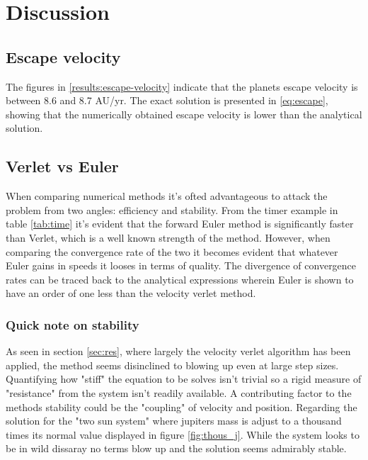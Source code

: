 \section{Discussion}
\subsection{Escape velocity}
The figures in \ref{results:escape-velocity} indicate that the planets escape velocity is between
8.6 and 8.7 AU/yr. The exact solution is presented in \ref{eq:escape}, showing that the numerically
obtained escape velocity is lower than the analytical solution.

\subsection{Verlet vs Euler}

When comparing numerical methods it's ofted advantageous to attack the problem from two angles: efficiency and stability. From the timer example in table \ref{tab:time} it's evident that the forward Euler method is significantly  faster than Verlet, which is a well known strength of the method. However, when comparing the convergence rate of the two it becomes evident that whatever Euler gains in speeds it looses in terms of quality. The divergence of convergence rates can be traced back to the analytical expressions wherein Euler is shown to have an order of one less than the velocity verlet method.

\subsubsection{Quick note on stability}

As seen in section \ref{sec:res}, where largely the velocity verlet algorithm has been applied, the method seems disinclined to blowing up even at large step sizes. Quantifying how "stiff" the equation to be solves isn't trivial so a rigid measure of "resistance" from the system isn't readily available. A contributing factor to the  methods stability could be the "coupling" of velocity and position. Regarding the solution for the "two sun system" where jupiters mass is adjust to a thousand times its normal value displayed in figure \ref{fig:thous_j}. While the system looks to be in wild dissaray no terms blow up and the solution seems admirably stable. 


